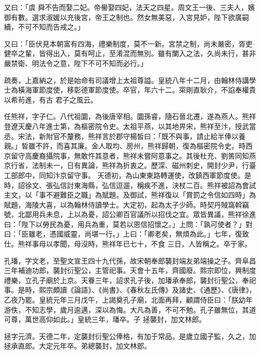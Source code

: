 \begin{pinyinscope}
 又曰：「虞
 舜不告而娶二妃。帝嚳娶四妃，法天之四星。周文王一後、三夫人，嬪御有數。選求淑媛以充後宮，帝王之制也。然女無美惡，入宮見妒，陛下欲廣嗣續，不可不知而告戒之。」



 又曰：「臣伏見本朝富有四海，禮樂制度，莫不一新。宮禁之制，尚未嚴密，胥吏健卒之輩，皆得出入，莫有呵止，至淆混而無別。雖有闌入之法，久尚未行，甚非嚴禁衛、明法令之意，陛下不可不知而必行。」



 疏奏，上嘉納之，於是始命有司議增上太祖尊謚。皇統八年十二月，由翰林侍講學士為橫海軍節度使，移彰德軍節度使。卒官，年六十二。寀剛直耿介，不諂奉權貴以希茍進，有古
 君子之風云。



 任熊祥，字子仁。八代祖圜，為後唐宰相。圜孫睿，隨石晉北遷，遂為燕人。熊祥登遼天慶八年進士第，為樞密院令史。太祖平燕，以其地畀宋，熊祥至汴，授武當丞。宋法，新附官不釐務，熊祥言於郡守楊皙曰：「既不與事，請止給半俸以養親。」皙雖不許，而喜其廉。金人取均、房州，熊祥歸朝，復為樞密院令史。時西京留守高慶裔攝院事，無敢忤其意者，熊祥未嘗阿意事之。其後杜充、劉筈同知燕京行省，法制未一，日有異論，熊祥為折衷之。歷深、磁州刺史，開封少尹，行臺工部郎中，同知汴京留守事。
 天德初，為山東東路轉運使，改鎮西軍節度使。是時，詔徐文、張弘信討東海縣，弘信逗遛，稱疾不進，決杖二百。熊祥被詔為會試主文，以「事不避難臣之職」為賦題。及御試，熊祥復以「賞罰之令信如四時」為賦題，海陵大喜，以為翰林侍讀學士。大定初，起為太子少師。時契丹賊窩斡竊號，北鄙用兵未息，上以為憂，詔公卿百官議所以招伐之宜。眾皆異議，熊祥徐進曰：「陛下以勞民為憂，用兵為重，莫若以恩信招懷之。」上問：「孰可使者？」對曰：「臣雖老，憑國威靈，尚堪一行。」上曰：「卿老矣，無煩為此。」七年，復致仕。熊祥事母以孝聞，母沒時，熊祥年已七十，不食
 三日，人皆稱之。卒于家。



 孔璠，字文老，至聖文宣王四十九代孫，故宋朝奉郎襲封端友弟端操之子。齊阜昌三年補迪功郎，襲封衍聖公，主管祀事。天會十五年，齊國廢。熙宗即位，興制度禮樂，立孔子廟於上京。天眷三年，詔求孔子後，加璠承奉郎，襲封衍聖公，奉祀事。是時，熙宗頗讀《論語》、《尚書》、《春秋左氏傳》及諸史、《通歷》、《唐律》，乙夜乃罷。皇統元年三月戊午，上謁奠孔子廟，北面再拜，顧謂侍臣曰：「朕幼年游佚，不知志學，歲月逾邁，深以為悔。大凡為善，不可不勉。孔子雖無位，其道可尊，萬世高仰如此。」皇統三年，璠卒。子
 拯襲封，加文林郎。



 拯字元濟。天德二年，定襲封衍聖公俸格，有加于常品。是歲立國子監，久之，加拯承直郎。大定元年卒。弟總襲封，加文林郎。




\end{pinyinscope}
